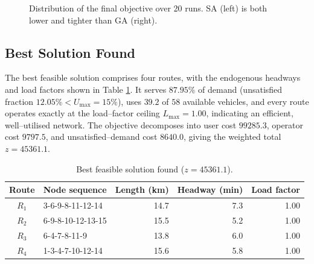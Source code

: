 \documentclass [a4paper, 11pt, titlepage] {article}
\begin{document}
\begin{figure}[!htb]
  \centering
  \caption{Distribution of the final objective over 20 runs. SA (left) is both
  lower and tighter than GA (right).}
  \label{fig:box}
\end{figure}

\subsection{Best Solution Found}
The best feasible solution comprises four routes, with the endogenous headways
and load factors shown in Table \ref{tab:best}. It serves $87.95\%$ of demand
(unsatisfied fraction $12.05\% < U_{\max}=15\%$), uses $39.2$ of $58$ available
vehicles, and every route operates exactly at the load--factor ceiling
$L_{\max}=1.00$, indicating an efficient, well--utilised network. The objective
decomposes into user cost $99285.3$, operator cost $9797.5$, and
unsatisfied--demand cost $8640.0$, giving the weighted total $z=45361.1$.

\begin{table}[!htb]
  \centering
  \begin{tabular}{|c|l|r|r|r|}
    \hline
    Route & Node sequence & Length (km) & Headway (min) & Load factor \\
    \hline
    $R_1$ & 3-6-9-8-11-12-14  & 14.7 & 7.3 & 1.00 \\
    $R_2$ & 6-9-8-10-12-13-15 & 15.5 & 5.2 & 1.00 \\
    $R_3$ & 6-4-7-8-11-9      & 13.8 & 6.0 & 1.00 \\
    $R_4$ & 1-3-4-7-10-12-14  & 15.6 & 5.8 & 1.00 \\
    \hline
  \end{tabular}
  \caption{Best feasible solution found ($z=45361.1$).}
  \label{tab:best}
\end{table}
\end{document}
